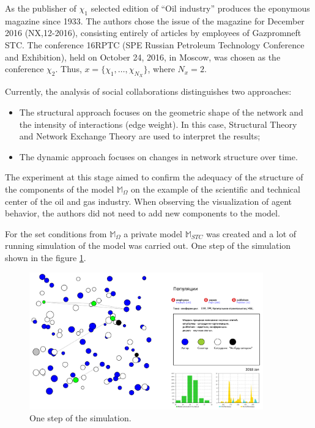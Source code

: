 \documentclass[12pt]{report}
\theoremstyle{definition}
\providecommand{\tightlist}{%
	\setlength{\itemsep}{0pt}\setlength{\parskip}{0pt}}
\begin{document}
As the publisher of $\chi_1$ selected edition of ``Oil industry'' produces the eponymous magazine since 1933. 
The authors chose the issue of the magazine for December 2016 (NX,12-2016), consisting entirely of articles by employees of Gazpromneft STC. 
The conference 16RPTC (SPE Russian Petroleum Technology Conference and Exhibition), held on October 24, 2016, in Moscow, was chosen as the conference $\chi_2$. 
Thus, $x = \{ \chi_1, \dots, \chi_{N_X}\}$, where $ N_{x} = 2$.

Currently, the analysis of social collaborations distinguishes two approaches:
\begin{itemize}
	\tightlist
	\item 
	The structural approach focuses on the geometric shape of the network and the intensity of interactions (edge weight). 
	In this case, Structural Theory and Network Exchange Theory are used to interpret the results;
	\item 
	The dynamic approach focuses on changes in network structure over time.
\end{itemize}

The experiment at this stage aimed to confirm the adequacy of the structure of the components of the model $\mathbb{M}_{\Omega}$ on the example of the scientific and technical center of the oil and gas industry. When observing the visualization of agent behavior, the authors did not need to add new components to the model.

For the set conditions from $\mathbb{M}_{\Omega}$ a private model $\mathbb{M}_{STC}$ was created and a lot of running simulation of the model was carried out.
One step of the simulation shown in the figure \ref{fig:so1}.
	
\begin{figure}[ht]
	\centering
	\includegraphics[width=0.9\textwidth]{so1}
	\caption{One step of the simulation.}
	\label{fig:so1}
\end{figure}
\end{document}
